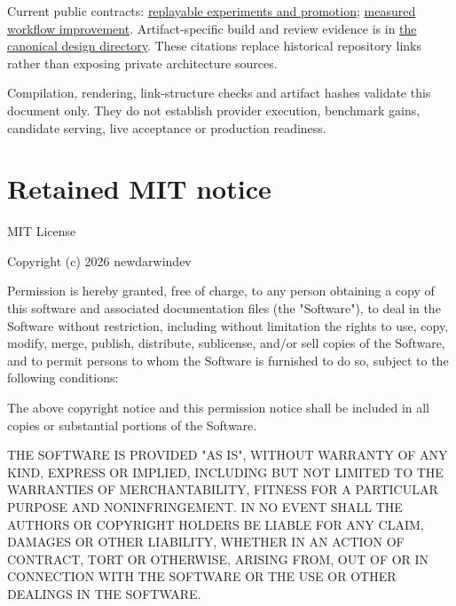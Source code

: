 \documentclass[11pt]{article}
\begin{document}
Current public contracts: \href{https://github.com/newdarwindev/runspindle-refinery/blob/main/specs/experiments.md}{replayable experiments and promotion}; \href{https://github.com/newdarwindev/runspindle-refinery/blob/main/specs/desired-intent.md}{measured workflow improvement}. Artifact-specific build and review evidence is in \href{https://github.com/newdarwindev/runspindle-refinery/tree/main/docs/design}{the canonical design directory}. These citations replace historical repository links rather than exposing private architecture sources.

Compilation, rendering, link-structure checks and artifact hashes validate this document only. They do not establish provider execution, benchmark gains, candidate serving, live acceptance or production readiness.
\section*{Retained MIT notice}
MIT License

Copyright (c) 2026 newdarwindev

Permission is hereby granted, free of charge, to any person obtaining a copy
of this software and associated documentation files (the "Software"), to deal
in the Software without restriction, including without limitation the rights
to use, copy, modify, merge, publish, distribute, sublicense, and/or sell
copies of the Software, and to permit persons to whom the Software is
furnished to do so, subject to the following conditions:

The above copyright notice and this permission notice shall be included in all
copies or substantial portions of the Software.

THE SOFTWARE IS PROVIDED "AS IS", WITHOUT WARRANTY OF ANY KIND, EXPRESS OR
IMPLIED, INCLUDING BUT NOT LIMITED TO THE WARRANTIES OF MERCHANTABILITY,
FITNESS FOR A PARTICULAR PURPOSE AND NONINFRINGEMENT. IN NO EVENT SHALL THE
AUTHORS OR COPYRIGHT HOLDERS BE LIABLE FOR ANY CLAIM, DAMAGES OR OTHER
LIABILITY, WHETHER IN AN ACTION OF CONTRACT, TORT OR OTHERWISE, ARISING FROM,
OUT OF OR IN CONNECTION WITH THE SOFTWARE OR THE USE OR OTHER DEALINGS IN THE
SOFTWARE.
\end{document}
